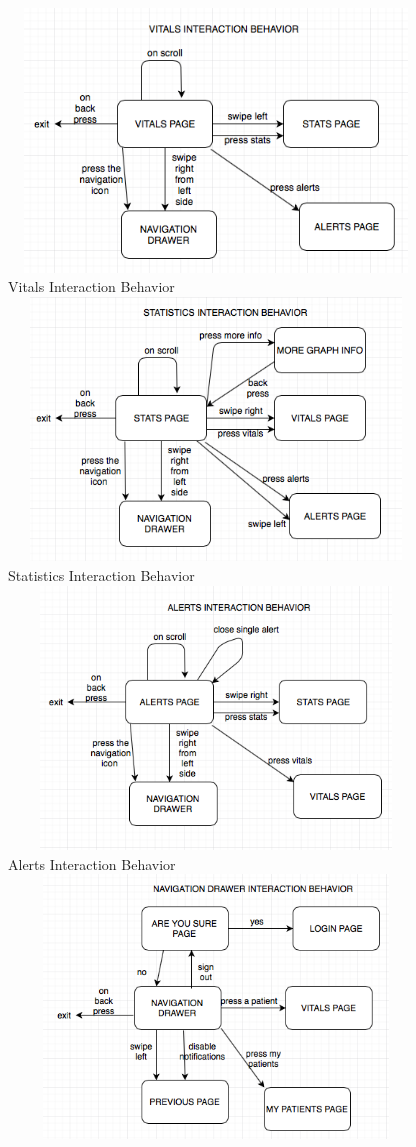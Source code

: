 \begin{center}
\includegraphics[width=11cm, height=7cm]{Diagrams/vitalsIB.png}
\\
Vitals Interaction Behavior
\\
\includegraphics[width=11cm, height=7cm]{Diagrams/statsIB.png}
\\
Statistics Interaction Behavior
\\
\includegraphics[width=11cm, height=7cm]{Diagrams/alertsIB.png}
\\
Alerts Interaction Behavior
\\
\includegraphics[width=11cm, height=7cm]{Diagrams/navdrawerIB.png}

\end{center}
